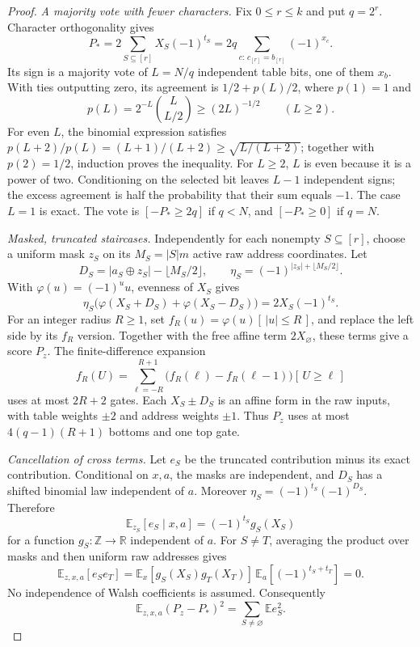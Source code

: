 \documentclass[11pt]{article}
\newcommand{\ind}[1]{[\,#1\,]}
\begin{document}
\begin{proof}
\emph{A majority vote with fewer characters.}
Fix $0\le r\le k$ and put $q=2^r$. Character orthogonality gives
$$
P_*=2\sum_{S\subseteq[r]}X_S(-1)^{t_S}
 =2q\sum_{c:\,c_{[r]}=b_{[r]}}(-1)^{x_c}.
$$
Its sign is a majority vote of $L=N/q$ independent table bits, one of them
$x_b$. With ties outputting zero, its agreement is
$1/2+p(L)/2$, where $p(1)=1$ and
$$
p(L)=2^{-L}\binom{L}{L/2}\ge(2L)^{-1/2}\qquad(L\ge2).
$$
For even $L$, the binomial expression satisfies
$p(L+2)/p(L)=(L+1)/(L+2)\ge\sqrt{L/(L+2)}$; together with
$p(2)=1/2$, induction proves the inequality.
For $L\ge2$, $L$ is even because it is a power of two. Conditioning on
the selected bit leaves $L-1$ independent signs; the excess agreement is
half the probability that their sum equals $-1$. The case $L=1$ is exact.
The vote is $[-P_*\ge2q]$ if $q<N$, and $[-P_*\ge0]$ if $q=N$.

\emph{Masked, truncated staircases.}
Independently for each nonempty $S\subseteq[r]$, choose a uniform mask $z_S$
on its $M_S=|S|m$ active raw address coordinates. Let
$$
D_S=|a_S\oplus z_S|-\lfloor M_S/2\rfloor,\qquad
\eta_S=(-1)^{|z_S|+\lfloor M_S/2\rfloor}.
$$
With $\varphi(u)=(-1)^u u$, evenness of $X_S$ gives
$$
\eta_S\bigl(\varphi(X_S+D_S)+\varphi(X_S-D_S)\bigr)
 =2X_S(-1)^{t_S}.
$$
For an integer radius $R\ge1$, set
$f_R(u)=\varphi(u)\ind{|u|\le R}$, and replace the left side by its
$f_R$ version. Together with the free affine term $2X_\varnothing$, these
terms give a score $P_z$. The finite-difference expansion
$$
f_R(U)=\sum_{\ell=-R}^{R+1}
 \bigl(f_R(\ell)-f_R(\ell-1)\bigr)\ind{U\ge\ell}
$$
uses at most $2R+2$ gates. Each $X_S\pm D_S$ is an affine form in the raw
inputs, with table weights $\pm2$ and address weights $\pm1$.
Thus $P_z$ uses at most $4(q-1)(R+1)$ bottoms and one top gate.

\emph{Cancellation of cross terms.}
Let $e_S$ be the truncated contribution minus its exact contribution.
Conditional on $x,a$, the masks are independent, and
$D_S$ has a shifted binomial law independent of $a$. Moreover
$\eta_S=(-1)^{t_S}(-1)^{D_S}$. Therefore
$$
\mathbb E_{z_S}[e_S\mid x,a]=(-1)^{t_S}g_S(X_S)
$$
for a function $g_S:\mathbb Z\to\mathbb R$ independent of $a$. For $S\ne T$, averaging the product
over masks and then uniform raw addresses gives
$$
\mathbb E_{z,x,a}[e_Se_T]
 =\mathbb E_x[g_S(X_S)g_T(X_T)]\,
   \mathbb E_a[(-1)^{t_S+t_T}]=0.
$$
No independence of Walsh coefficients is assumed. Consequently
\begin{equation}\label{eq:maskl2}
\mathbb E_{z,x,a}(P_z-P_*)^2=\sum_{S\ne\varnothing}\mathbb E e_S^2.
\end{equation}


\end{proof}
\end{document}
